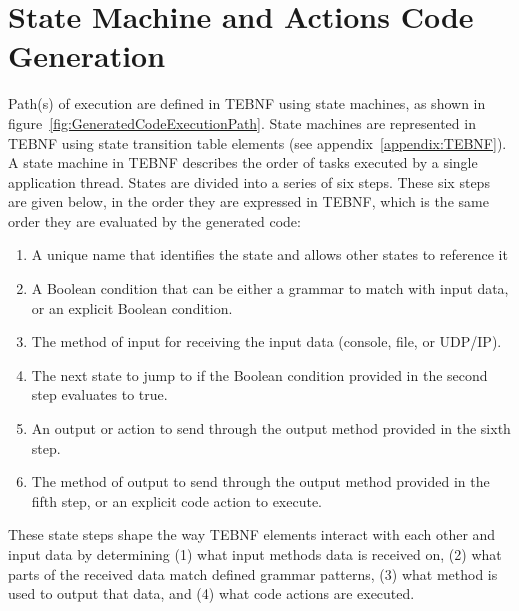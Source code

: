 \section{State Machine and Actions Code Generation}
Path(s) of execution are defined in TEBNF using state machines, as shown in figure~\ref{fig:GeneratedCodeExecutionPath}.  State machines are represented in TEBNF using state transition table elements (see appendix~\ref{appendix:TEBNF}).  A state machine in TEBNF describes the order of tasks executed by a single application thread.  States are divided into a series of six steps.  These six steps are given below, in the order they are expressed in TEBNF, which is the same order they are evaluated by the generated code:
\begin{enumerate}
  \item A unique name that identifies the state and allows other states to reference it
  \item A Boolean condition that can be either a grammar to match with input data, or an explicit Boolean condition.
  \item The method of input for receiving the input data (console, file, or UDP/IP).
  \item The next state to jump to if the Boolean condition provided in the second step evaluates to true.
  \item An output or action to send through the output method provided in the sixth step.
  \item The method of output to send through the output method provided in the fifth step, or an explicit code action to execute.
\end{enumerate}

\indent
These state steps shape the way TEBNF elements interact with each other and input data by determining (1) what input methods data is received on, (2) what parts of the received data match defined grammar patterns, (3) what method is used to output that data, and (4) what code actions are executed.














